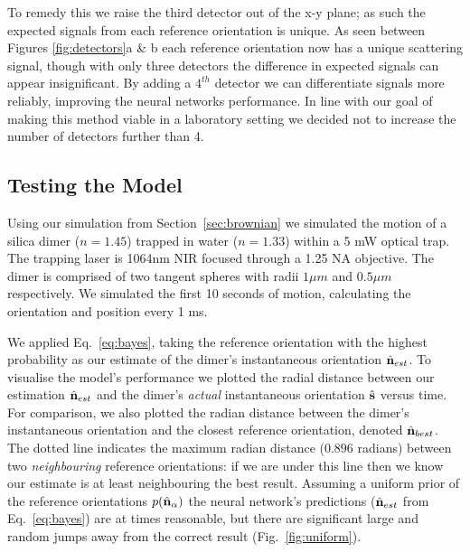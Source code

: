 \documentclass[12pt]{spieman}
\begin{document}
\begin{spacing}{1.5}
To remedy this we raise the third detector out of the x-y plane; as such the expected signals from each reference orientation is unique. As seen between Figures \ref{fig:detectors}a \& b each reference orientation now has a unique scattering signal, though with only three detectors the difference in expected signals can appear insignificant. By adding a $4^{th}$ detector we can differentiate signals more reliably, improving the neural networks performance.   In line with our goal of making this method viable in a laboratory setting we decided not to increase the number of detectors further than 4. 

\subsection{Testing the Model}
\label{sec:test}
Using our simulation from Section~\ref{sec:brownian} we simulated the motion of a silica dimer ($n = 1.45$) trapped in water ($n = 1.33$) within a 5 mW optical trap. The trapping laser is 1064nm NIR focused through a 1.25 NA objective. The dimer is comprised of two tangent spheres with radii $1 \mu m$ and $0.5 \mu m$ respectively. We simulated the first 10 seconds of motion, calculating the orientation and position every 1 ms. 

We applied Eq.~\eqref{eq:bayes}, taking the reference orientation with the highest probability  as our estimate of the dimer's instantaneous orientation $\hat{\bf n}_{est}$. To visualise the model's performance  we plotted the radial distance between our estimation $\hat{\bf n}_{est}$ and the dimer's \emph{actual} instantaneous orientation $\hat{\bf s}$ versus time. For comparison, we also plotted the radian distance between the  dimer's instantaneous orientation and the closest reference orientation, denoted $\hat{\bf n}_{best}$. The dotted line indicates the maximum radian distance ($0.896$ radians) between two \textit{neighbouring} reference orientations: if we are under this line then we know our estimate is at least neighbouring the best result. Assuming a uniform prior of the reference orientations $p(\hat{\bf n}_\alpha)$  the neural network's predictions ($\hat{\bf n}_{est}$ from Eq.~\eqref{eq:bayes}) are at times reasonable, but there are significant large and random jumps away from the correct result (Fig.~\ref{fig:uniform}). 


\end{spacing}
\end{document}

